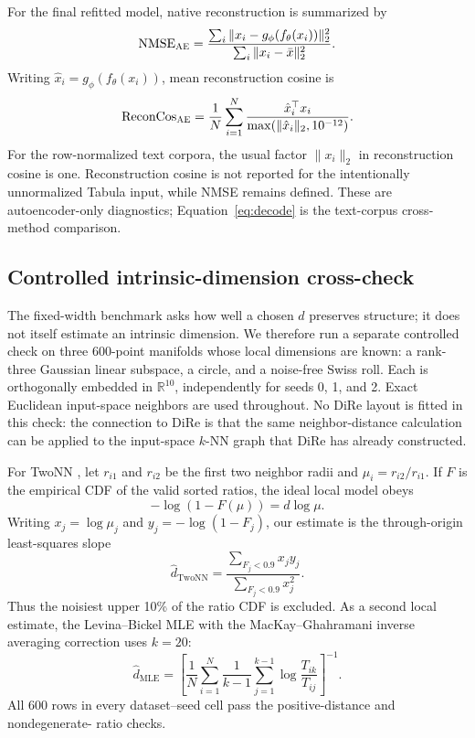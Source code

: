 \documentclass[10pt]{article}
\newcommand{\AEmethod}{\textsc{AE}}
\newcommand{\R}{\mathbb{R}}
\begin{document}
For the final refitted model, native reconstruction is summarized by
\[
 \operatorname{NMSE}_{\AEmethod}
 =\frac{\sum_i\|x_i-g_\phi(f_\theta(x_i))\|_2^2}
        {\sum_i\|x_i-\bar{x}\|_2^2}.
\]
Writing $\hat x_i=g_\phi(f_\theta(x_i))$, mean reconstruction cosine is
\[
 \operatorname{ReconCos}_{\AEmethod}
 =\frac1N\sum_{i=1}^N
   \frac{\hat x_i^\top x_i}{\max(\|\hat x_i\|_2,10^{-12})}.
\]
For the row-normalized text corpora, the usual factor $\|x_i\|_2$ in reconstruction
cosine is one.  Reconstruction cosine is not reported for the intentionally unnormalized
Tabula input, while NMSE remains defined.  These are autoencoder-only diagnostics;
Equation~\eqref{eq:decode} is the text-corpus cross-method comparison.

\subsection{Controlled intrinsic-dimension cross-check}

The fixed-width benchmark asks how well a chosen $d$ preserves structure; it does not
itself estimate an intrinsic dimension.  We therefore run a separate controlled check
on three 600-point manifolds whose local dimensions are known: a rank-three Gaussian
linear subspace, a circle, and a noise-free Swiss roll.  Each is orthogonally embedded
in $\R^{10}$, independently for seeds 0, 1, and 2.  Exact Euclidean input-space
neighbors are used throughout.  No DiRe layout is fitted in this check: the connection
to DiRe is that the same neighbor-distance calculation can be applied to the input-space
$k$-NN graph that DiRe has already constructed.

For TwoNN \cite{facco2017}, let $r_{i1}$ and $r_{i2}$ be the first two neighbor radii
and $\mu_i=r_{i2}/r_{i1}$.  If $F$ is the empirical CDF of the valid sorted ratios, the
ideal local model obeys
\begin{equation}
 -\log\!\left(1-F(\mu)\right)=d\log\mu.
 \label{eq:twonn}
\end{equation}
Writing $x_j=\log\mu_j$ and $y_j=-\log(1-F_j)$, our estimate is the through-origin
least-squares slope
\begin{equation}
 \widehat d_{\mathrm{TwoNN}}
 =\frac{\sum_{F_j<0.9}x_jy_j}{\sum_{F_j<0.9}x_j^2}.
 \label{eq:twonn-fit}
\end{equation}
Thus the noisiest upper 10\% of the ratio CDF is excluded.  As a second local estimate,
the Levina--Bickel MLE with the MacKay--Ghahramani inverse averaging correction
\cite{levina2004} uses $k=20$:
\begin{equation}
 \widehat d_{\mathrm{MLE}}
 =\left[\frac1N\sum_{i=1}^{N}\frac1{k-1}
   \sum_{j=1}^{k-1}\log\frac{T_{ik}}{T_{ij}}\right]^{-1}.
 \label{eq:id-mle}
\end{equation}
All 600 rows in every dataset--seed cell pass the positive-distance and nondegenerate-
ratio checks.
\end{document}
